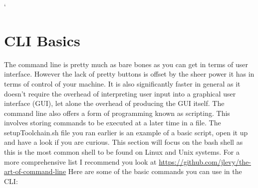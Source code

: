 `\documentclass[a4paper,11pt]{report}
\begin{document}
		\section{CLI Basics}
			The command line is pretty much as bare bones as you can get in terms of user interface.
			However the lack of pretty buttons is offset by the sheer power it has in terms of control of your machine.
			It is also significantly faster in general as it doesn't require the overhead of interpreting user input into a graphical user interface (GUI), let alone the overhead of producing the GUI itself.
			The command line also offers a form of programming known as scripting.
			This involves storing commands to be executed at a later time in a file.
			The setupToolchain.sh file you ran earlier is an example of a basic script, open it up and have a look if you are curious.
			This section will focus on the bash shell as this is the most common shell to be found on Linux and Unix systems.
			For a more comprehensive list I recommend you look at \url{https://github.com/jlevy/the-art-of-command-line}
			Here are some of the basic commands you can use in the CLI:
\end{document}
